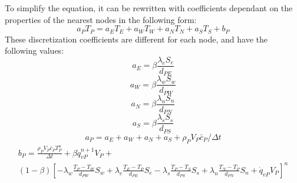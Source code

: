 \label{DiscrCond}
To simplify the equation, it can be rewritten with coefficients dependant on the properties of the nearest nodes in the following form:
\begin{equation}
a_{P}T_{P}=a_{E}T_{E}+a_{W}T_{W}+a_{N}T_{N}+a_{S}T_{S}+b_{P}
\end{equation}
These discretization coefficients are different for each node, and have the following values:
\begin{equation}
a_{E}=\beta\frac{\lambda_{e}S_{e}}{d_{PE}}
\end{equation}
\begin{equation}
a_{W}=\beta\frac{\lambda_{w}S_{w}}{d_{PW}}
\end{equation}
\begin{equation}
a_{N}=\beta\frac{\lambda_{n}S_{n}}{d_{PN}}
\end{equation}
\begin{equation}
a_{S}=\beta\frac{\lambda_{s}S_{s}}{d_{PS}}
\end{equation}
\begin{equation}
a_{P}=a_{E}+a_{W}+a_{N}+a_{S}+\rho_{P}V_{P}\bar{c}_{P}/\Delta t
\end{equation}
\begin{multline}
b_{P}=\frac{\rho_{P}V_{P}\bar{c}_{P}T_{P}^{n}}{\Delta t}+\beta\dot{q}_{vP}^{n+1}V_{P}+ \\
\left(1-\beta\right)\left[-\lambda_{w}\frac{T_{P}-T_{W}}{d_{PW}}S_{w}+\lambda_{e}\frac{T_{E}-T_{P}}{d_{PE}}S_{e}-\lambda_{s}\frac{T_{P}-T_{S}}{d_{PS}}S_{s}+\lambda_{n}\frac{T_{N}-T_{P}}{d_{PN}}S_{n}+\dot{q}_{vP}V_{P}\right]^{n}
\end{multline}

